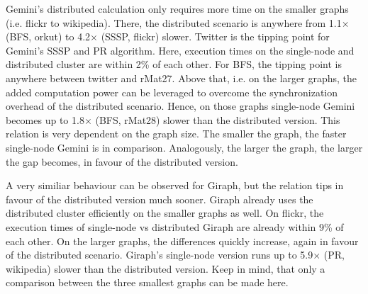 Gemini's distributed calculation only requires more time on the smaller graphs (i.e. flickr to wikipedia). There, the distributed scenario is anywhere from 1.1$\times$ (BFS, orkut) to 4.2$\times$ (SSSP, flickr) slower.
Twitter is the tipping point for Gemini's SSSP and PR algorithm. Here, execution times on the single-node and distributed cluster are within 2\% of each other. For BFS, the tipping point is anywhere between twitter and rMat27.
Above that, i.e. on the larger graphs, the added computation power can be leveraged to overcome the synchronization overhead of the distributed scenario. Hence, on those graphs single-node Gemini becomes up to 1.8$\times$ (BFS, rMat28) slower than the distributed version.
This relation is very dependent on the graph size. The smaller the graph, the faster single-node Gemini is in comparison. Analogously, the larger the graph, the larger the gap becomes, in favour of the distributed version.

A very similiar behaviour can be observed for Giraph, but the relation tips in favour of the distributed version much sooner. Giraph already uses the distributed cluster efficiently on the smaller graphs as well.
On flickr, the execution times of single-node vs distributed Giraph are already within 9\% of each other.
On the larger graphs, the differences quickly increase, again in favour of the distributed scenario. Giraph's single-node version runs up to 5.9$\times$ (PR, wikipedia) slower than the distributed version.
Keep in mind, that only a comparison between the three smallest graphs can be made here.




